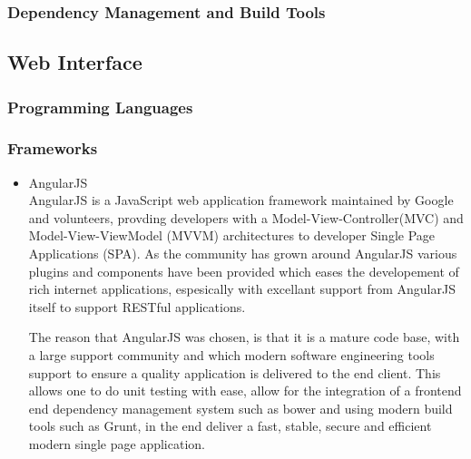 \documentclass[a4paper,10pt]{article}
\begin{document}
\subsubsection{Dependency Management and Build Tools}

\subsection{Web Interface}
\subsubsection{Programming Languages}
\subsubsection{Frameworks}
	\begin{itemize}
	\item AngularJS\\
		AngularJS is a JavaScript web application framework maintained by Google and volunteers, provding developers with a Model-View-Controller(MVC) and Model-View-ViewModel (MVVM) architectures to developer Single Page Applications (SPA). As the community has grown around AngularJS various plugins and components have been provided which eases the developement of rich internet applications, espesically with excellant support from AngularJS itself to support RESTful applications.

		The reason that AngularJS was chosen, is that it is a mature code base, with a large support community and which modern software engineering tools support to ensure a quality application is delivered to the end client. This allows one to do unit testing with ease, allow for the integration of a frontend end dependency management system such as bower and using modern build tools such as Grunt, in the end deliver a fast, stable, secure and efficient modern single page application.
	\end{itemize}
\end{document}
